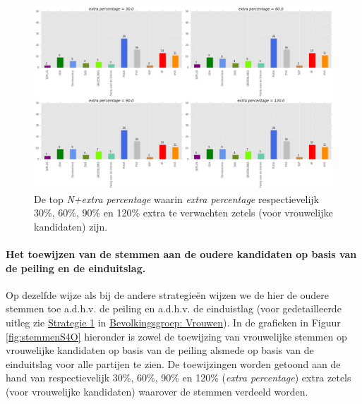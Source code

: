 \begin{figure}[H]

	\includegraphics[width=\linewidth]{topN_vermenigvuldiging_ouderen.png}

			\caption{De top \textit{N+extra percentage} waarin \textit{extra percentage} respectievelijk 30\%, 60\%, 90\% en 120\% extra te verwachten zetels (voor vrouwelijke kandidaten)  zijn.}

\label{fig:NexpO}
\end{figure}



\paragraph{Het toewijzen van de stemmen aan de oudere kandidaten op basis van de peiling en de einduitslag.}
Op dezelfde wijze als bij de andere strategie\"{e}n wijzen we de hier de oudere stemmen toe a.d.h.v. de peiling en a.d.h.v. de einduistlag (voor gedetailleerde uitleg zie \hyperref[S1V]{Strategie 1} in \hyperref[vrouwen]{Bevolkingsgroep: Vrouwen}). In de grafieken in Figuur \ref{fig:stemmenS4O} hieronder is zowel de toewijzing van vrouwelijke stemmen op vrouwelijke kandidaten op basis van de peiling alsmede op basis van de einduitslag voor alle partijen te zien. De toewijzingen worden getoond aan de hand van respectievelijk 30\%, 60\%, 90\% en 120\% (\textit{extra percentage}) extra zetels (voor vrouwelijke kandidaten) waarover de stemmen verdeeld worden.

